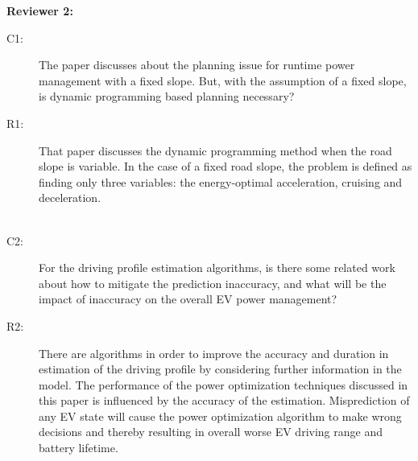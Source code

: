 \documentclass[onecolumn]{IEEEconf}
\begin{document}
\textbf{Reviewer 2:}
\begin{description}
\item [C1: ] The paper discusses about the planning issue for runtime power management with a fixed slope. But, with the assumption of a fixed slope, is dynamic programming based planning necessary?
\item [R1: ] That paper discusses the dynamic programming method when the road slope is variable. In the case of a fixed road slope, the problem is defined as finding only three variables: the energy-optimal acceleration, cruising and deceleration.\\
~\\

\item [C2: ] For the driving profile estimation algorithms, is there some related work about how to mitigate the prediction inaccuracy, and what will be the impact of inaccuracy on the overall EV power management?
\item [R2: ] 
There are algorithms in order to improve the accuracy and duration in estimation of the driving profile by considering further information in the model. The performance of the power optimization techniques discussed in this paper is influenced by the accuracy of the estimation. Misprediction of any EV state will cause the power optimization algorithm to make wrong decisions and thereby resulting in overall worse EV driving range and battery lifetime.





\end{description}
\end{document}
